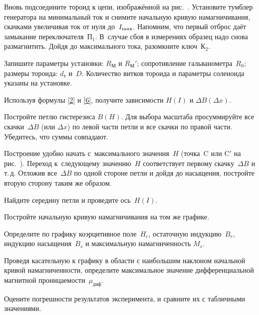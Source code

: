 \begin{lab:task}
	\item Вновь подсоедините тороид к цепи, изображённой 
    на рис.~. Установите тумблер генератора на минимальный ток и
снимите  начальную кривую намагничивания,  скачками увеличивая ток от нуля 
до~$I_{\rm max}$. Напомним, что первый отброс даёт замыкание 
переключателя~$\text{П}_1$. В~случае сбоя в измерениях образец надо снова размагнитить.
Дойдя до максимального тока, разомкните ключ~К$_2$.

	\item Запишите параметры установки: $R_{М}$ и $R_{М}'$;
сопротивление гальванометра~$R_0$; размеры тороида: $d_{т}$ и~$D$. 
Количество витков тороида и параметры соленоида указаны на установке.


		\item Используя формулы \eqref{2} и \eqref{6}, получите зависимости
        $H(I)$ и $\Delta B(\Delta x)$.

		\item Постройте петлю гистерезиса $B(H)$. Для выбора масштаба
просуммируйте все скачки~$\Delta B$ (или $\Delta x$) по левой части
		петли и все скачки по правой части. Убедитесь, что суммы совпадают.

		Построение удобно начать с~максимального значения~$H$ (точка~C или
C$'$ на рис.~). Переход к~следующему
значению~$H$ соответствует первому скачку~$\Delta B$ и т.\,д.
Отложив все~$\Delta B$ по одной стороне петли и дойдя до насыщения, постройте
вторую сторону таким же образом.

		Найдите середину петли и проведите ось~$H(I)$.

		\item Постройте начальную кривую намагничивания на том же графике.

		\item Определите по графику коэрцитивное поле~$H_c$,
        остаточную индукцию~$B_r$, индукцию насыщения~$B_s$ и 
        максимальную намагниченность $M_s$.

		\item Проведя касательную к графику в области с наибольшим наклоном 
        начальной кривой намагниченности, определите максимальное значение 
        дифференциальной магнитной проницаемости~$\mu_\text{диф}$.

		\item Оцените погрешности результатов эксперимента,
        и сравните их с табличными значениями.

 

\end{lab:task}


